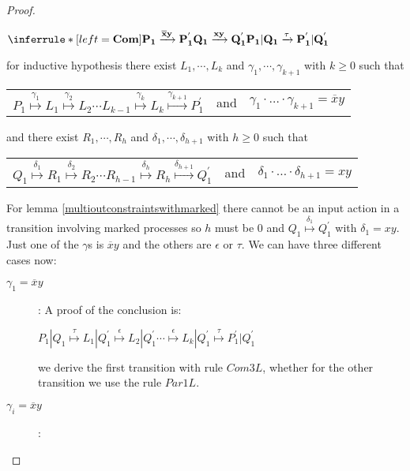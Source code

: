 \begin{proposition}
\begin{proof}
\begin{description}
\begin{center}
	  $\inferrule* [left=\bf{Com}]{
	      P_{1} \xrightarrow{\overline{x}y} P_{1}^{'}
	    \\
	      Q_{1} \xrightarrow{xy} Q_{1}^{'}
	  }{
	    P_{1}|Q_{1} \xrightarrow{\tau} P_{1}^{'}|Q_{1}^{'}
	  }$
	\end{center}
	for inductive hypothesis there exist $L_{1}, \cdots, L_{k}$ and $\gamma_{1}, \cdots, \gamma_{k+1}$ with $k\geq 0$ such that 
	\begin{center}
	  \begin{tabular}{lll}
	    $P_{1} \stackrel{\gamma_{1}}{\longmapsto} L_{1}  \stackrel{\gamma_{2}}{\longmapsto} L_{2} \cdots L_{k-1} \stackrel{\gamma_{k}}{\longmapsto} L_{k} \stackrel{\gamma_{k+1}}{\longmapsto} P_{1}^{'}$ 
	  &
	    and
	  &
	    $\gamma_{1} \cdot \ldots \cdot \gamma_{k+1} = \overline{x}y$
	  \end{tabular}
	\end{center}
	and there exist $R_{1}, \cdots, R_{h}$ and $\delta_{1}, \cdots, \delta_{h+1}$ with $h\geq 0$ such that 
	\begin{center}
	  \begin{tabular}{lll}
	    $Q_{1} \stackrel{\delta_{1}}{\longmapsto} R_{1}  \stackrel{\delta_{2}}{\longmapsto} R_{2} \cdots R_{h-1} \stackrel{\delta_{h}}{\longmapsto} R_{h} \stackrel{\delta_{h+1}}{\longmapsto} Q_{1}^{'}$ 
	  &
	    and
	  &
	    $\delta_{1} \cdot \ldots \cdot \delta_{h+1} = xy$
	  \end{tabular}
	\end{center}
	For lemma \ref{multioutconstraintswithmarked} there cannot be an input action in a transition involving marked processes so $h$ must be $0$ and $Q_{1} \stackrel{\delta_{1}}{\longmapsto} Q_{1}^{'}$ with $\delta_{1}=xy$. Just one of the $\gamma$s is $\overline{x}y$ and the others are $\epsilon$ or $\tau$. We can have three different cases now: 
	\begin{description}
	  \item[$\gamma_{1}=\overline{x}y$]:
	    A proof of the conclusion is:
	    \begin{center}
	      $P_{1}|Q_{1} \stackrel{\tau}{\longmapsto} L_{1}|Q_{1}^{'}
			      \stackrel{\epsilon}{\longmapsto} L_{2}|Q_{1}^{'}
		  \cdots
				\stackrel{\epsilon}{\longmapsto} L_{k}|Q_{1}^{'}
				\stackrel{\tau}{\longmapsto} P_{1}^{'}|Q_{1}^{'}$	  
	    \end{center}
	    we derive the first transition with rule $Com3L$, whether for the other transition we use the rule $Par1L$.
	  \item[$\gamma_{i}=\overline{x}y$]:

\end{description}
\end{description}
\end{proof}
\end{proposition}
